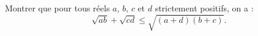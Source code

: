 Montrer que pour tous réels $a$, $b$, $c$ et $d$ strictement positifs, on a :
\[
\sqrt{ab} + \sqrt{cd} \leq \sqrt{(a+d)(b+c)}.
\]
